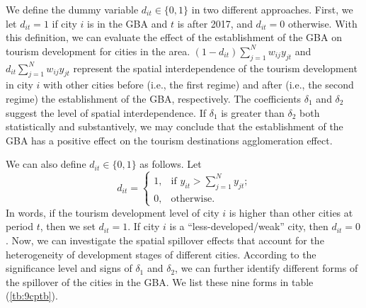 \documentclass[11pt,a4paper]{amsart}
\theoremstyle{plain}
\theoremstyle{definition}
\begin{document}
\noindent We define the dummy variable $d_{it} \in \{0, 1\}$ in two different approaches. First, we let $d_{it} = 1$ if city $i$ is in the GBA and $t$ is after 2017, and $d_{it} = 0$ otherwise. With this definition, we can evaluate the effect of the establishment of the GBA on tourism development for cities in the area. $(1-d_{it})\sum_{j = 1}^{N}w_{ij}y_{jt}$ and $d_{it}\sum_{j = 1}^{N}w_{ij}y_{jt}$  represent the spatial interdependence of the tourism development in city $i$ with other cities before (i.e., the first regime) and after (i.e., the second regime) the establishment of the GBA, respectively. The coefficients $\delta_{1}$ and $\delta_{2}$ suggest the level of spatial interdependence. If $\delta_{1}$ is greater than $\delta_{2}$ both statistically and substantively, we may conclude that the establishment of the GBA has a positive effect on the tourism destinations agglomeration effect.

\noindent  We can also define $d_{it} \in \{0, 1\}$ as follows. Let 
\[	d_{it} = \begin{cases}
	1, &\text{if $y_{it} > \sum_{j = 1}^{N}y_{jt}$;}\\
	0, &\text{otherwise.}
\end{cases}	\]
In words, if the tourism development level of city $i$ is higher than other cities at period $t$, then we set $d_{it} = 1$. If city $i$ is a ``less-developed/weak'' city, then $d_{it} = 0$. Now, we can investigate the spatial spillover effects that account for the heterogeneity of development stages of different cities. According to the significance level and signs of $\delta_{1}$ and $\delta_{2}$, we can further identify different forms of the spillover of the cities in the GBA. We list these nine forms in table (\ref{tb:9cptb}). 
\end{document}
